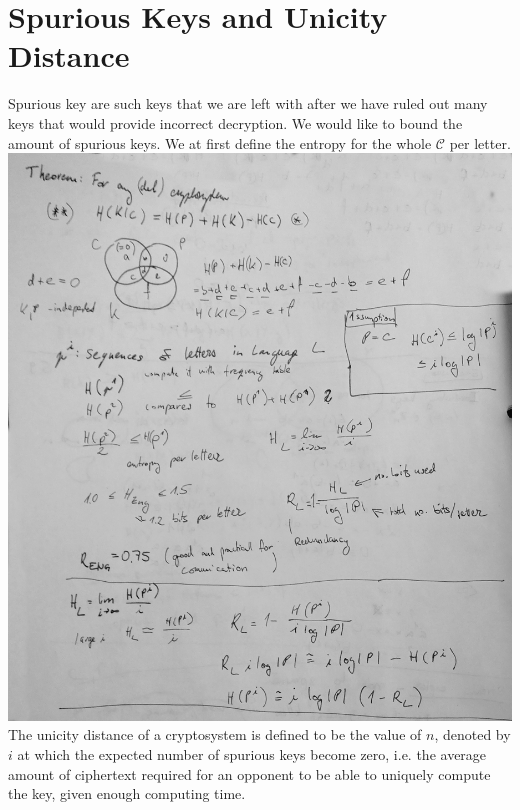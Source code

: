 \documentclass[a4paper,10pt]{article}
\newcommand{\mc}[1]{\ensuremath{\mathcal{#1}}}
\begin{document}
\section*{Spurious Keys and Unicity Distance}
Spurious key are such keys that we are left with after we have ruled out many keys that would provide incorrect decryption. We would like to bound the amount of spurious keys. We at first define the entropy for the whole \mc{C} per letter.\\
\includegraphics[width=\textwidth]{entropy.jpg}
The unicity distance of a cryptosystem is defined to be the value of $n$, denoted by $i$ at which the expected number of spurious keys become zero, i.e. the average amount of ciphertext required for an opponent to be able to uniquely compute the key, given enough computing time.\\
\end{document}

